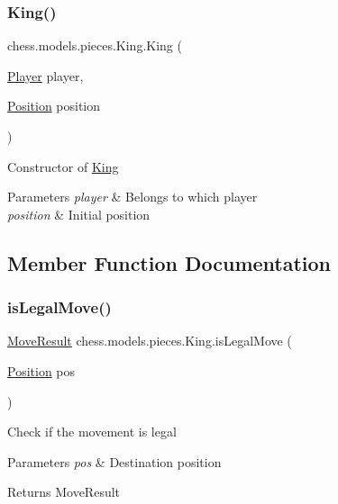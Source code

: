\subsubsection{\texorpdfstring{King()}{King()}}
{\footnotesize\ttfamily chess.\+models.\+pieces.\+King.\+King (\begin{DoxyParamCaption}\item[{\mbox{\hyperlink{enumchess_1_1models_1_1enums_1_1_player}{Player}}}]{player,  }\item[{\mbox{\hyperlink{classchess_1_1models_1_1_position}{Position}}}]{position }\end{DoxyParamCaption})}

Constructor of \mbox{\hyperlink{classchess_1_1models_1_1pieces_1_1_king}{King}}


\begin{DoxyParams}{Parameters}
{\em player} & Belongs to which player \\
\hline
{\em position} & Initial position \\
\hline
\end{DoxyParams}


\subsection{Member Function Documentation}
\mbox{\label{classchess_1_1models_1_1pieces_1_1_king_ad72471e97d1e053467189babdc18c231}} 
\subsubsection{\texorpdfstring{is\+Legal\+Move()}{isLegalMove()}}
{\footnotesize\ttfamily \mbox{\hyperlink{enumchess_1_1models_1_1enums_1_1_move_result}{Move\+Result}} chess.\+models.\+pieces.\+King.\+is\+Legal\+Move (\begin{DoxyParamCaption}\item[{\mbox{\hyperlink{classchess_1_1models_1_1_position}{Position}}}]{pos }\end{DoxyParamCaption})}

Check if the movement is legal


\begin{DoxyParams}{Parameters}
{\em pos} & Destination position \\
\hline
\end{DoxyParams}
\begin{DoxyReturn}{Returns}
Move\+Result 
\end{DoxyReturn}
\mbox{\label{classchess_1_1models_1_1pieces_1_1_king_ae287258d6c093ce7d7c3196f7dde6d99}} 

